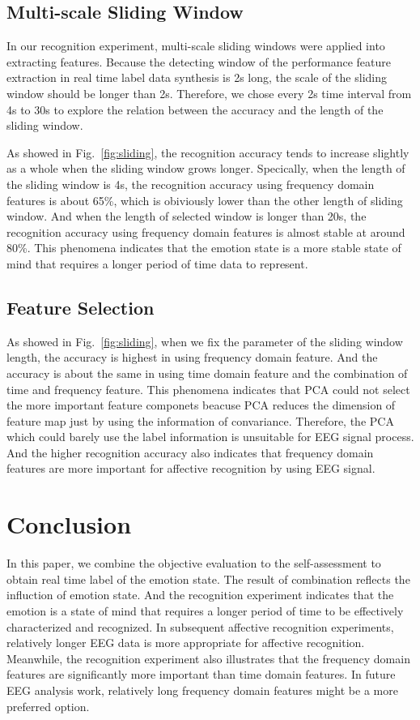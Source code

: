 \documentclass[runningheads,a4paper]{llncs}
\begin{document}
\subsection{Multi-scale Sliding Window}
In our recognition experiment, multi-scale sliding windows were applied into
extracting features. Because the detecting window of the performance feature extraction
in real time label data synthesis is 2s long, the scale of the sliding window
should be longer than 2s. Therefore, we chose every 2s time interval from 4s to
30s to explore the relation between the accuracy and the length of the sliding
window.

As showed in Fig.~\ref{fig:sliding}, the recognition accuracy tends to
increase slightly as a whole when the sliding window grows longer. Specically,
when the length of the sliding window is 4s, the recognition accuracy using
frequency domain features is about 65\%, which is obiviously lower than the
other length of sliding window. And when the length of selected window is
longer than 20s, the recognition accuracy using frequency domain features
is almost stable at around 80\%. This phenomena indicates that the emotion
state is a more stable state of mind that requires a longer period of time
data to represent.

\subsection{Feature Selection}
As showed in Fig.~\ref{fig:sliding}, when we fix the parameter of the sliding window
length, the accuracy is highest in using frequency domain feature. And the accuracy
is about the same in using time domain feature and the combination of time and frequency
feature. This phenomena indicates that PCA could not select the more important
feature componets beacuse PCA reduces the dimension of feature map just by using
the information of convariance. Therefore, the PCA which could barely use the label
information is unsuitable for EEG signal process.
And the higher recognition accuracy also indicates that frequency domain features
are more important for affective recognition by using EEG signal.




\section{Conclusion}
In this paper, we combine the objective evaluation to the self-assessment to obtain
real time label of the emotion state. The result of combination reflects the influction
of emotion state. And the recognition experiment indicates that the emotion is
a state of mind that requires a longer period of time to be effectively characterized
and recognized. In subsequent affective recognition experiments, relatively longer
EEG data is more appropriate for affective recognition. Meanwhile, the recognition
experiment also illustrates that the frequency domain features are significantly
more important than time domain features. In future EEG analysis work, relatively
long frequency domain features might be a more preferred option.
\end{document}
